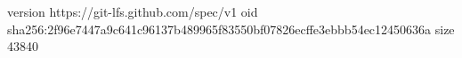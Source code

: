 version https://git-lfs.github.com/spec/v1
oid sha256:2f96e7447a9c641c96137b489965f83550bf07826ecffe3ebbb54ec12450636a
size 43840
